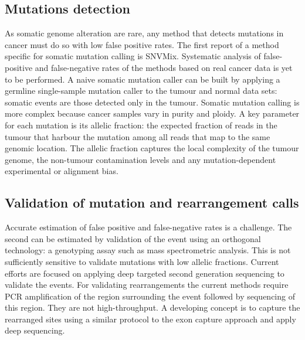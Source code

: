 	\subsection{Mutations detection}
	As somatic genome alteration are rare, any method that detects mutations in cancer must do so with low false positive rates.
	The first report of a method specific for somatic mutation calling is SNVMix.
	Systematic analysis of false-positive and false-negative rates of the methods based on real cancer data is yet to be performed.
	A naive somatic mutation caller can be built by applying a germline single-sample mutation caller to the tumour and normal data sets: somatic events are those detected only in the tumour.
	Somatic mutation calling is more complex because cancer samples vary in purity and ploidy.
	A key parameter for each mutation is its allelic fraction: the expected fraction of reads in the tumour that harbour the mutation among all reads that map to the same genomic location.
	The allelic fraction captures the local complexity of the tumour genome, the non-tumour contamination levels and any mutation-dependent experimental or alignment bias.

	\subsection{Validation of mutation and rearrangement calls}
	Accurate estimation of false positive and false-negative rates is a challenge.
	The second can be estimated by validation of the event using an orthogonal technology: a genotyping assay such as mass spectrometric analysis.
	This is not sufficiently sensitive to validate mutations with low allelic fractions.
	Current efforts are focused on applying deep targeted second generation sequencing to validate the events.
	For validating rearrangements the current methods require PCR amplification of the region surrounding the event followed by sequencing of this region.
	They are not high-throughput.
	A developing concept is to capture the rearranged sites using a similar protocol to the exon capture approach and apply deep sequencing.
